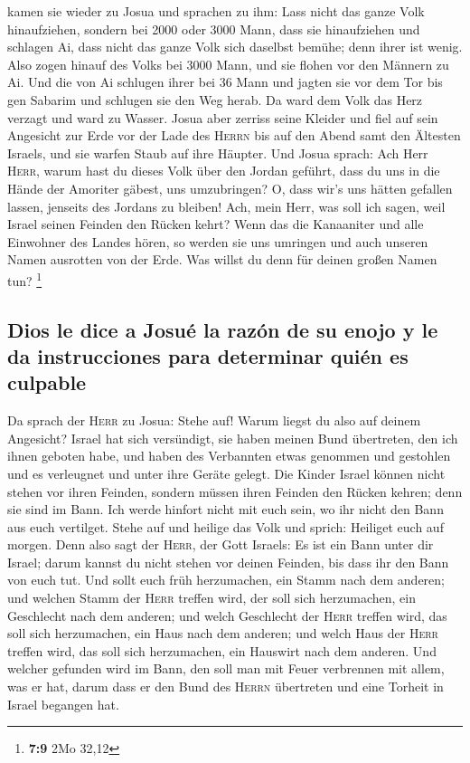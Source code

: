  kamen sie wieder zu Josua und sprachen zu ihm: Lass nicht
das ganze Volk hinaufziehen, sondern bei 2000 oder 3000 Mann, dass sie
hinaufziehen und schlagen Ai, dass nicht das ganze Volk sich daselbst
bemühe; denn ihrer ist wenig.  Also zogen hinauf des Volks
bei 3000 Mann, und sie flohen vor den Männern zu Ai.  Und
die von Ai schlugen ihrer bei 36 Mann und jagten sie vor dem Tor bis gen
Sabarim und schlugen sie den Weg herab. Da ward dem Volk das Herz
verzagt und ward zu Wasser.  Josua aber zerriss seine
Kleider und fiel auf sein Angesicht zur Erde vor der Lade des
\textsc{Herrn} bis auf den Abend samt den Ältesten Israels, und sie
warfen Staub auf ihre Häupter.  Und Josua sprach: Ach Herr
\textsc{Herr}, warum hast du dieses Volk über den Jordan geführt, dass
du uns in die Hände der Amoriter gäbest, uns umzubringen? O, dass wir's
uns hätten gefallen lassen, jenseits des Jordans zu bleiben!
 Ach, mein Herr, was soll ich sagen, weil Israel seinen
Feinden den Rücken kehrt?  Wenn das die Kanaaniter und
alle Einwohner des Landes hören, so werden sie uns umringen und auch
unseren Namen ausrotten von der Erde. Was willst du denn für deinen
großen Namen tun? \footnote{\textbf{7:9} 2Mo 32,12}

\hypertarget{dios-le-dice-a-josuuxe9-la-razuxf3n-de-su-enojo-y-le-da-instrucciones-para-determinar-quiuxe9n-es-culpable}{%
\subsection{Dios le dice a Josué la razón de su enojo y le da
instrucciones para determinar quién es
culpable}\label{dios-le-dice-a-josuuxe9-la-razuxf3n-de-su-enojo-y-le-da-instrucciones-para-determinar-quiuxe9n-es-culpable}}

 Da sprach der \textsc{Herr} zu Josua: Stehe auf! Warum
liegst du also auf deinem Angesicht?  Israel hat sich
versündigt, sie haben meinen Bund übertreten, den ich ihnen geboten
habe, und haben des Verbannten etwas genommen und gestohlen und es
verleugnet und unter ihre Geräte gelegt.  Die Kinder
Israel können nicht stehen vor ihren Feinden, sondern müssen ihren
Feinden den Rücken kehren; denn sie sind im Bann. Ich werde hinfort
nicht mit euch sein, wo ihr nicht den Bann aus euch vertilget.
 Stehe auf und heilige das Volk und sprich: Heiliget euch
auf morgen. Denn also sagt der \textsc{Herr}, der Gott Israels: Es ist
ein Bann unter dir Israel; darum kannst du nicht stehen vor deinen
Feinden, bis dass ihr den Bann von euch tut.  Und sollt
euch früh herzumachen, ein Stamm nach dem anderen; und welchen Stamm der
\textsc{Herr} treffen wird, der soll sich herzumachen, ein Geschlecht
nach dem anderen; und welch Geschlecht der \textsc{Herr} treffen wird,
das soll sich herzumachen, ein Haus nach dem anderen; und welch Haus der
\textsc{Herr} treffen wird, das soll sich herzumachen, ein Hauswirt nach
dem anderen.  Und welcher gefunden wird im Bann, den soll
man mit Feuer verbrennen mit allem, was er hat, darum dass er den Bund
des \textsc{Herrn} übertreten und eine Torheit in Israel begangen hat.

